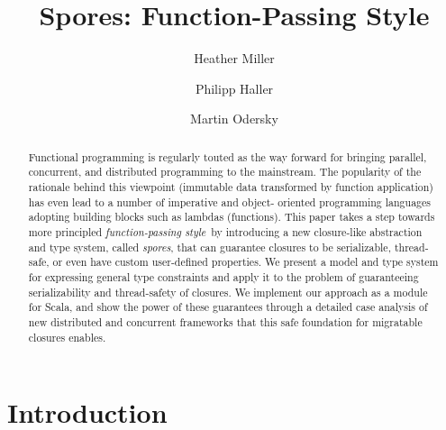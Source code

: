 \documentclass{llncs}
\begin{document}
%
\mainmatter              %
%
\title{Spores: Function-Passing Style}
%
%
\author{Heather Miller \and Philipp Haller
\and Martin Odersky}
%
%
%

\maketitle              %

\begin{abstract}

Functional programming is regularly touted as the way forward for bringing
parallel, concurrent, and distributed programming to the mainstream. The
popularity of the rationale behind this viewpoint (immutable data transformed
by function application) has even lead to a number of imperative and  object-
oriented programming languages adopting building blocks such as lambdas
(functions). This paper takes a
step towards more principled {\em function-passing style}~by introducing a new closure-like
abstraction and type system, called {\em spores}, that can guarantee closures
to be serializable, thread-safe, or even have custom user-defined properties.
We present a model and type system for expressing general type constraints and
apply it to the problem of guaranteeing serializability and thread-safety of
closures. We implement our approach as a module for Scala, and show the power
of these guarantees through a detailed case analysis of new distributed and
concurrent frameworks that this safe foundation for migratable closures
enables.

\end{abstract}
%
\section{Introduction}
\end{document}
